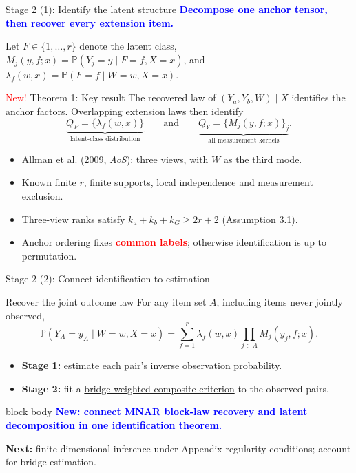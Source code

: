 \documentclass[aspectratio=169,10pt]{beamer}
\newcommand{\Prb}{\mathbb P}
\newcommand{\bluekey}[1]{\textcolor{Blue}{\textbf{#1}}}
\newcommand{\redkey}[1]{\textcolor{Red}{\textbf{#1}}}
\newcommand{\term}[1]{\underline{#1}}
\newenvironment{takeaway}{%
  \begin{beamercolorbox}[rounded=true,sep=.7em,wd=\linewidth]{block body}%
  \color{Navy}\bfseries}{\end{beamercolorbox}}
\begin{document}
\begin{frame}{Stage 2 (1): Identify the latent structure}
\bluekey{Decompose one anchor tensor, then recover every extension item.}\par
\smallskip
Let $F\in\{1,\ldots,r\}$ denote the latent class,
$M_j(y,f;x)=\Prb(Y_j=y\mid F=f,X=x)$, and
$\lambda_f(w,x)=\Prb(F=f\mid W=w,X=x)$.
\begin{block}{\textcolor{Red}{New!} Theorem 1: Key result}
The recovered law of $(Y_a,Y_b,W)\mid X$ identifies the anchor factors.
Overlapping extension laws then identify
\[
\underbrace{Q_F=\{\lambda_f(w,x)\}}_{\text{latent-class distribution}}
\qquad\text{and}\qquad
\underbrace{Q_Y=\{M_j(y,f;x)\}_j}_{\text{all measurement kernels}}.
\]
\end{block}
\begin{itemize}
\item Allman et al. (2009, \emph{AoS}): three views, with $W$ as the third mode.
\item Known finite $r$, finite supports, local independence and measurement exclusion.
\item Three-view ranks satisfy $k_a+k_b+k_G\ge 2r+2$ (Assumption 3.1).
\item Anchor ordering fixes \redkey{common labels}; otherwise identification is up to permutation.
\end{itemize}
\end{frame}

\begin{frame}{Stage 2 (2): Connect identification to estimation}
\begin{block}{Recover the joint outcome law}
For any item set $A$, including items never jointly observed,
\[
\Prb(Y_A=y_A\mid W=w,X=x)
=\sum_{f=1}^r\lambda_f(w,x)\prod_{j\in A}M_j(y_j,f;x).
\]
\end{block}
\begin{itemize}
\item \textbf{Stage 1:} estimate each pair's inverse observation probability.
\item \textbf{Stage 2:} fit a \term{bridge-weighted composite criterion} to the observed pairs.
\end{itemize}
\medskip
\begin{takeaway}
\bluekey{New: connect MNAR block-law recovery and latent decomposition in one identification theorem.}
\end{takeaway}
\medskip
\textbf{Next:} finite-dimensional inference under Appendix regularity conditions;
account for bridge estimation.
\end{frame}
\end{document}
